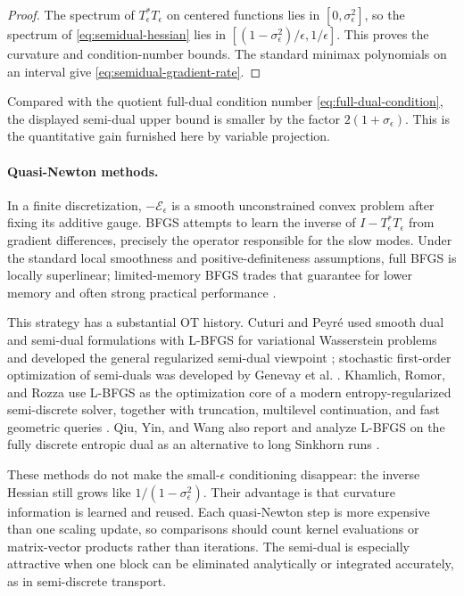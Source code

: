 \documentclass[11pt]{article}
\theoremstyle{definition}
\theoremstyle{remark}
\newcommand{\eps}{\epsilon}
\newcommand{\Ee}{\mathcal{E}}
\begin{document}
\begin{proof}
The spectrum of $T_\eps^\ast T_\eps$ on centered functions lies in
$[0,\sigma_\eps^2]$, so
the spectrum of \eqref{eq:semidual-hessian} lies in
$[(1-\sigma_\eps^2)/\eps,1/\eps]$. This proves the curvature and
condition-number bounds. The standard minimax polynomials on an interval give
\eqref{eq:semidual-gradient-rate}.
\end{proof}

Compared with the quotient full-dual condition number
\eqref{eq:full-dual-condition}, the displayed semi-dual upper bound is
smaller by the factor $2(1+\sigma_\eps)$. This is the quantitative gain
furnished here by variable projection.

\paragraph{Quasi-Newton methods.}
In a finite discretization, $-\Ee_\eps$ is a smooth unconstrained
convex problem after fixing its additive gauge. BFGS attempts to learn
the inverse of $I-T_\eps^\ast T_\eps$ from gradient differences, precisely the
operator responsible for the slow modes. Under the standard local
smoothness and positive-definiteness assumptions, full BFGS is locally
superlinear; limited-memory BFGS trades that guarantee for lower memory
and often strong practical performance \cite{NocedalWright2006}.

This strategy has a substantial OT history. Cuturi and Peyr\'e used
smooth dual and semi-dual formulations with L-BFGS for variational
Wasserstein problems and developed the general regularized semi-dual
viewpoint \cite{CuturiPeyre2016,CuturiPeyre2018}; stochastic
first-order optimization of semi-duals was developed by Genevay et al.
\cite{GenevayEtAl2016}. Khamlich, Romor, and
Rozza use L-BFGS as the optimization core of a modern
entropy-regularized semi-discrete solver, together with truncation,
multilevel continuation, and fast geometric queries
\cite{KhamlichRomorRozza2026}. Qiu, Yin, and Wang also report and analyze
L-BFGS on the fully discrete entropic dual as an alternative to long
Sinkhorn runs \cite{QiuYinWang2023}.

These methods do not make the small-$\eps$ conditioning disappear: the
inverse Hessian still grows like $1/(1-\sigma_\eps^2)$. Their advantage
is that curvature information is learned and reused. Each quasi-Newton
step is more expensive than one scaling update, so comparisons should
count kernel evaluations or matrix-vector products rather than
iterations. The semi-dual is especially attractive when one block can
be eliminated analytically or integrated accurately, as in
semi-discrete transport.
\end{document}

